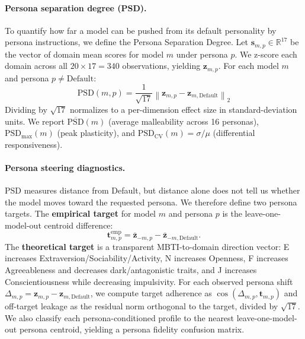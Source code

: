 \documentclass[11pt]{article}
\begin{document}
\paragraph{Persona separation degree (PSD).}
To quantify how far a model can be pushed from its default personality by persona instructions, we define the Persona Separation Degree. Let $\mathbf{s}_{m,p} \in \mathbb{R}^{17}$ be the vector of domain mean scores for model $m$ under persona $p$. We z-score each domain across all $20 \times 17 = 340$ observations, yielding $\mathbf{z}_{m,p}$. For each model $m$ and persona $p \neq \mathrm{Default}$:
\begin{equation}
\mathrm{PSD}(m, p) = \frac{1}{\sqrt{17}}\left\| \mathbf{z}_{m,p} - \mathbf{z}_{m,\mathrm{Default}} \right\|_2
\label{eq:psd}
\end{equation}
Dividing by $\sqrt{17}$ normalizes to a per-dimension effect size in standard-deviation units. We report $\overline{\mathrm{PSD}}(m)$ (average malleability across 16 personas), $\mathrm{PSD}_{\max}(m)$ (peak plasticity), and $\mathrm{PSD}_{\mathrm{CV}}(m) = \sigma/\mu$ (differential responsiveness).

\paragraph{Persona steering diagnostics.}
PSD measures distance from Default, but distance alone does not tell us whether the model moves toward the requested persona. We therefore define two persona targets. The \textbf{empirical target} for model $m$ and persona $p$ is the leave-one-model-out centroid difference:
\begin{equation}
\mathbf{t}^{\mathrm{emp}}_{m,p} =
\bar{\mathbf{z}}_{-m,p} - \bar{\mathbf{z}}_{-m,\mathrm{Default}} .
\end{equation}
The \textbf{theoretical target} is a transparent MBTI-to-domain direction vector: E increases Extraversion/Sociability/Activity, N increases Openness, F increases Agreeableness and decreases dark/antagonistic traits, and J increases Conscientiousness while decreasing impulsivity. For each observed persona shift $\Delta_{m,p}=\mathbf{z}_{m,p}-\mathbf{z}_{m,\mathrm{Default}}$, we compute target adherence as $\cos(\Delta_{m,p}, \mathbf{t}_{m,p})$ and off-target leakage as the residual norm orthogonal to the target, divided by $\sqrt{17}$. We also classify each persona-conditioned profile to the nearest leave-one-model-out persona centroid, yielding a persona fidelity confusion matrix.
\end{document}
